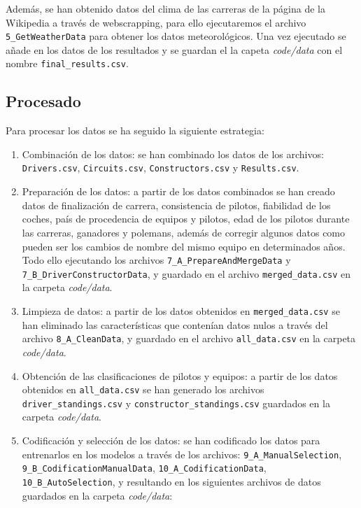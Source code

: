 Además, se han obtenido datos del clima de las carreras de la página de la Wikipedia a través de webscrapping, para ello ejecutaremos el archivo \texttt{5\_GetWeatherData} para obtener los datos meteorológicos. Una vez ejecutado se añade en los datos de los resultados y se guardan el la capeta \textit{code/data} con el nombre \texttt{final\_results.csv}.

\subsection{Procesado}

Para procesar los datos se ha seguido la siguiente estrategia:

\begin{enumerate}
    \item Combinación de los datos: se han combinado los datos de los archivos: \texttt{Drivers.csv}, \texttt{Circuits.csv}, \texttt{Constructors.csv} y \texttt{Results.csv}. 
    \item Preparación de los datos: a partir de los datos combinados se han creado datos de finalización de carrera, consistencia de pilotos, fiabilidad de los coches, país de procedencia de equipos y pilotos, edad de los pilotos durante las carreras, ganadores y polemans, además de corregir algunos datos como pueden ser los cambios de nombre del mismo equipo en determinados años. Todo ello ejecutando los archivos \texttt{7\_A\_PrepareAndMergeData} y \texttt{7\_B\_DriverConstructorData}, y guardado en el archivo \texttt{merged\_data.csv} en la carpeta \textit{code/data}.
    \item Limpieza de datos: a partir de los datos obtenidos en \texttt{merged\_data.csv} se han eliminado las características que contenían datos nulos a través del archivo \texttt{8\_A\_CleanData}, y guardado en el archivo \texttt{all\_data.csv} en la carpeta \textit{code/data}.
    \item Obtención de las clasificaciones de pilotos y equipos: a partir de los datos obtenidos en \texttt{all\_data.csv} se han generado los archivos \texttt{driver\_standings.csv} y \texttt{constructor\_standings.csv} guardados en la carpeta \textit{code/data}.
    \item Codificación y selección de los datos: se han codificado los datos para entrenarlos en los modelos a través de los archivos: \texttt{9\_A\_ManualSelection}, \texttt{9\_B\_CodificationManualData}, \texttt{10\_A\_CodificationData}, \texttt{10\_B\_AutoSelection}, y resultando en los siguientes archivos de datos guardados en la carpeta \textit{code/data}:

\end{enumerate}
